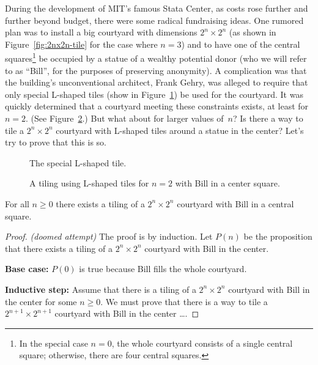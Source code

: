 During the development of MIT's famous Stata Center, as costs rose
further and further beyond budget, there were some radical fundraising
ideas.  One rumored plan was to install a big courtyard with
dimensions $2^n \times 2^n$ (as shown in Figure~\ref{fig:2nx2n-tile}
for the case where $n = 3$) and to have one of the central
squares\footnote{In the special case $n = 0$, the whole courtyard
  consists of a single central square; otherwise, there are four
  central squares.} be occupied by a statue of a wealthy potential
donor (who we will refer to as ``Bill'', for the purposes of
preserving anonymity). A complication was that the building's
unconventional architect, Frank Gehry, was alleged to require that
only special L-shaped tiles (show in Figure~\ref{fig:Ltile}) be used
for the courtyard.  It was quickly determined that a courtyard meeting
these constraints exists, at least for $n = 2$.  (See
Figure~\ref{fig:2Ltile}.)  But what about for larger values of~$n$?
Is there a way to tile a $2^n \times 2^n$ courtyard with L-shaped
tiles around a statue in the center?  Let's try to prove that this is so.

\begin{figure}


\caption{The special L-shaped tile.}
\label{fig:Ltile}
\end{figure}

\begin{figure}


\caption{A tiling using L-shaped tiles for $n = 2$ with Bill in a
  center square.}
\label{fig:2Ltile}
\end{figure}

\begin{theorem}\label{bill}
For all $n \geq 0$ there exists a tiling of a $2^n \times 2^n$
courtyard with Bill in a central square.
\end{theorem}

\begin{proof}
\emph{(doomed attempt)} The proof is by induction.  Let $P(n)$ be the
proposition that there exists a tiling of a $2^n \times 2^n$ courtyard
with Bill in the center.

\textbf{Base case:} $P(0)$ is true because Bill fills the whole courtyard.

\textbf{Inductive step:} Assume that there is a tiling of a
$2^n \times 2^n$ courtyard with Bill in the center for some $n \geq
0$.  We must prove that there is a way to tile a $2^{n+1} \times
2^{n+1}$ courtyard with Bill in the center \dots.
\end{proof}


